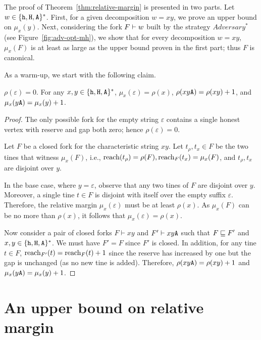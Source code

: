 

The proof of Theorem~\ref{thm:relative-margin} is presented in two parts. 
Let $w \in \{\mathtt{h}, \mathtt{H}, \mathtt{A}\}^*$.
First, for a given decomposition $w = xy$, 
we prove an upper bound on $\mu_x(y)$. 
Next, 
considering the fork $F \vdash w$ built by the strategy $Adversary^*$ 
(see Figure~\ref{fig:adv-opt-mh}), 
we show that 
for every decomposition $w = xy$, 
$\mu_x(F)$ is at least as large as the upper bound proven in the first part; 
thus $F$ is canonical. 

As a warm-up, we start with the following claim.

\begin{claim}\label{claim:rho-mu-A}
  $\rho(\varepsilon) = 0$. 
  For any $x, y \in \{\mathtt{h}, \mathtt{H}, \mathtt{A}\}^*$, 
  $\mu_x(\varepsilon) = \rho(x)$, 
  $\rho(xy\mathtt{A}) = \rho(xy) + 1$, 
  and $\mu_x(y\mathtt{A}) = \mu_x(y) + 1$.
\end{claim}
\begin{proof}
  The only possible fork for the empty string $\varepsilon$ 
  contains a single honest vertex 
  with reserve and gap both zero; 
  hence $\rho(\varepsilon) = 0$.

  Let $F$ be a closed fork for the characteristic string $xy$. 
  Let $t_\rho, t_x \in F$ be the two tines that witness $\mu_x(F)$, 
  i.e., $\operatorname{reach}(t_\rho) = \rho(F), \operatorname{reach}_F(t_x) = \mu_x(F)$, 
  and $t_\rho, t_x$ are disjoint over $y$. 


  In the base case, where $y=\varepsilon$, 
  observe that any two tines of $F$ 
  are disjoint over $y$. 
  Moreover, a single tine $t \in F$ 
  is disjoint with itself over the empty suffix $\varepsilon$. 
  Therefore, the relative margin $\mu_x(\varepsilon)$ must be at least $\rho(x)$. 
  As $\mu_x(F)$ can be no more than $\rho(x)$, it follows that 
  $\mu_x(\varepsilon) = \rho(x)$.


  Now consider a pair of closed forks $F\vdash xy$ and $F'\vdash xy\mathtt{A}$ 
  such that $F \sqsubseteq F'$ and $x,y\in\{\mathtt{h}, \mathtt{H}, \mathtt{A}\}^*$. 
  We must have $F' = F$ since $F'$ is closed. 
  In addition, for any tine $t \in F$, 
  $\operatorname{reach}_{F'}(t) = \operatorname{reach}_F(t) + 1$ 
  since the reserve has increased by one 
  but the gap is unchanged 
  (as no new tine is added). Therefore, 
  $\rho(xy\mathtt{A}) = \rho(xy) + 1$ and 
  $\mu_x(y\mathtt{A}) = \mu_x(y)+1$.
\end{proof}


\section{An upper bound on relative margin}

